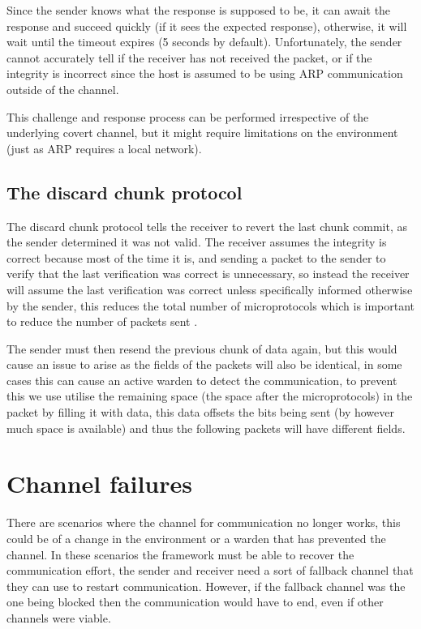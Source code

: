 Since the sender knows what the response is supposed to be, it can await the response and succeed quickly (if it sees the expected response), otherwise, it will wait until the timeout expires (5 seconds by default). Unfortunately, the sender cannot accurately tell if the receiver has not received the packet, or if the integrity is incorrect since the host is assumed to be using ARP communication outside of the channel.

This challenge and response process can be performed irrespective of the underlying covert channel, but it might require limitations on the environment (just as ARP requires a local network). 

\subsection{The discard chunk protocol}

The discard chunk protocol tells the receiver to revert the last chunk commit, as the sender determined it was not valid. The receiver assumes the integrity is correct because most of the time it is, and sending a packet to the sender to verify that the last verification was correct is unnecessary, so instead the receiver will assume the last verification was correct unless specifically informed otherwise by the sender, this reduces the total number of microprotocols which is important to reduce the number of packets sent \citep{DRiCCBoCP}.

The sender must then resend the previous chunk of data again, but this would cause an issue to arise as the fields of the packets will also be identical, in some cases this can cause an active warden to detect the communication, to prevent this we use utilise the remaining space (the space after the microprotocols) in the packet by filling it with data, this data offsets the bits being sent (by however much space is available) and thus the following packets will have different fields.

\section{Channel failures}
\label{sec:channel_failures}

There are scenarios where the channel for communication no longer works, this could be of a change in the environment or a warden that has prevented the channel. In these scenarios the framework must be able to recover the communication effort, the sender and receiver need a sort of fallback channel that they can use to restart communication. However, if the fallback channel was the one being blocked then the communication would have to end, even if other channels were viable.

